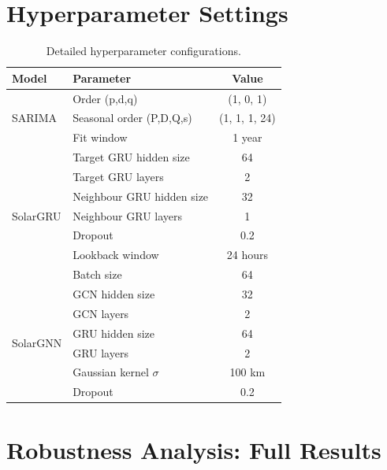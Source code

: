 \documentclass[11pt,a4paper]{article}
\begin{document}
\section{Hyperparameter Settings}
\label{app:hyperparams}

\begin{table}[H]
\centering
\caption{Detailed hyperparameter configurations.}
\label{tab:hyperparams}
\begin{tabular}{llc}
\toprule
\textbf{Model} & \textbf{Parameter} & \textbf{Value} \\
\midrule
\multirow{3}{*}{SARIMA}
& Order (p,d,q) & (1, 0, 1) \\
& Seasonal order (P,D,Q,s) & (1, 1, 1, 24) \\
& Fit window & 1 year \\
\midrule
\multirow{7}{*}{SolarGRU}
& Target GRU hidden size & 64 \\
& Target GRU layers & 2 \\
& Neighbour GRU hidden size & 32 \\
& Neighbour GRU layers & 1 \\
& Dropout & 0.2 \\
& Lookback window & 24 hours \\
& Batch size & 64 \\
\midrule
\multirow{6}{*}{SolarGNN}
& GCN hidden size & 32 \\
& GCN layers & 2 \\
& GRU hidden size & 64 \\
& GRU layers & 2 \\
& Gaussian kernel $\sigma$ & 100 km \\
& Dropout & 0.2 \\
\bottomrule
\end{tabular}
\end{table}

\section{Robustness Analysis: Full Results}
\label{app:robustness}
\end{document}
